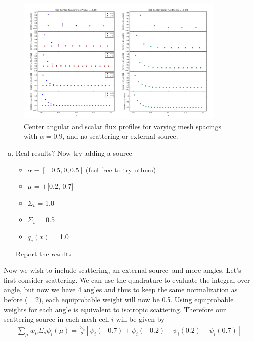 \documentclass[10pt]{article}
\begin{document}
\begin{figure}[H]
    \centering
    \includegraphics[width=0.9\textwidth]{Figures/FluxProfile_a=09}
    \caption{Center angular and scalar flux profiles for varying mesh spacings with $\alpha = 0.9$, and no scattering or external source.}
    \label{fig7}
\end{figure}

%
%
%

\begin{enumerate}[(c)]
\item Real results? Now try adding a source
\begin{itemize}
\setlength\itemsep{0em}
\item $\alpha = [-0.5, 0, 0.5]$ (feel free to try others)
\item $\mu$ = $\pm$[0.2, 0.7] %
\item $\Sigma_t$ = 1.0
\item $\Sigma_s$ = 0.5
\item $q_e(x)$ = 1.0
\end{itemize}
Report the results.
\end{enumerate}

Now we wish to include scattering, an external source, and more angles. Let's first consider scattering. We can use the quadrature to evaluate the integral over angle, but now we have 4 angles and thus to keep the same normalization as before (= 2), each equiprobable weight will now be 0.5. Using equiprobable weights for each angle is equivalent to isotropic scattering. Therefore our scattering source in each mesh cell $i$ will be given by
%
\begin{align*}
    \sum_\mu w_\mu \Sigma_s \psi_i(\mu) = \frac{\Sigma_s}{2}\left[\psi_i(-0.7) + \psi_i(-0.2) + \psi_i(0.2) + \psi_i(0.7)\right]
\end{align*}
\end{document}
